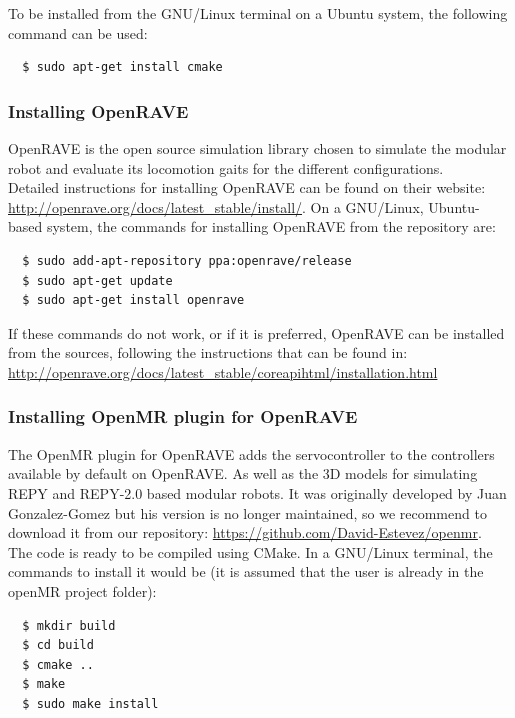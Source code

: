 To be installed from the GNU/Linux terminal on a Ubuntu system, the following command can be used:
\Bash
\begin{lstlisting}
  $ sudo apt-get install cmake
\end{lstlisting}


\subsubsection{Installing OpenRAVE}
\label{software_install_openrave}

OpenRAVE is the open source simulation library chosen to simulate the modular robot and evaluate its locomotion gaits for the different configurations.\\

Detailed instructions for installing OpenRAVE can be found on their website: \url{http://openrave.org/docs/latest_stable/install/}. On a GNU/Linux, Ubuntu-based system, the commands for installing OpenRAVE from the repository are:

\newpage

\Bash
\begin{lstlisting}
  $ sudo add-apt-repository ppa:openrave/release
  $ sudo apt-get update
  $ sudo apt-get install openrave
\end{lstlisting}

If these commands do not work, or if it is preferred, OpenRAVE can be installed from the sources, following the instructions that can be found in: \url{http://openrave.org/docs/latest_stable/coreapihtml/installation.html}\\

\subsubsection{Installing OpenMR plugin for OpenRAVE}
\label{software_install_openmr}

The OpenMR plugin for OpenRAVE adds the servocontroller to the controllers available by default on OpenRAVE. As well as the 3D models for simulating REPY and REPY-2.0 based modular robots. It was originally developed by Juan Gonzalez-Gomez but his version is no longer maintained, so we recommend to download it from our repository: \url{https://github.com/David-Estevez/openmr}.\\

The code is ready to be compiled using CMake. In a GNU/Linux terminal, the commands to install it would be (it is assumed that the user is already in the openMR project folder):
\Bash
\begin{lstlisting}
  $ mkdir build
  $ cd build
  $ cmake ..
  $ make
  $ sudo make install
\end{lstlisting}

